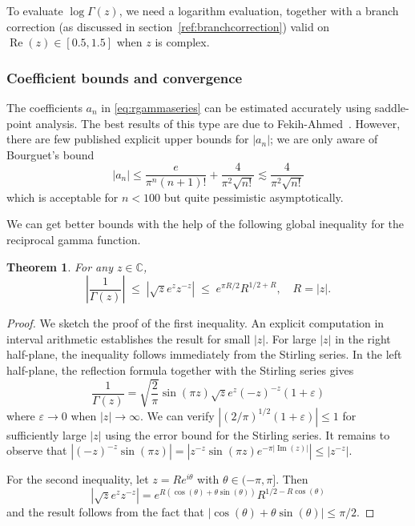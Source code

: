 \documentclass[reqno]{amsart}
\newcommand{\Real}{\operatorname{Re}}
\newcommand{\Imag}{\operatorname{Im}}
\newcommand{\CC}{\mathbb{C}}
\newtheorem{theorem}{Theorem}[section]
\theoremstyle{definition}
\begin{document}
To evaluate $\log \Gamma(z)$, we need a logarithm evaluation,
together with a branch correction (as discussed in section~\ref{ref:branchcorrection}) valid on $\Real(z) \in [0.5, 1.5]$
when $z$ is complex.


\subsubsection{Coefficient bounds and convergence}

The coefficients $a_n$ in \eqref{eq:rgammaseries} can be estimated accurately using
saddle-point analysis.
The best results of this type are due to Fekih-Ahmed~\cite{fekihahmed2017power}.
However, there are few published explicit upper bounds for $|a_n|$; we are only aware of Bourguet's bound \cite{Bourguet1883,fekihahmed2017power}
\begin{equation}
|a_n| \le \frac{e}{\pi^{n} (n+1)!} + \frac{4}{\pi^2 \sqrt{n!}} \lesssim \frac{4}{\pi^2 \sqrt{n!}}
\label{eq:bourguet}
\end{equation}
which is acceptable for $n < 100$ but quite pessimistic asymptotically.

We can get better
bounds with the help of the following global inequality for the reciprocal gamma function.

\begin{theorem}
\label{eq:globalbound}
For any $z \in \CC$,
\begin{equation}
\left| \frac{1}{\Gamma(z)} \right| \; \le \; \left| \sqrt{z} e^z z^{-z} \right| \; \le \; e^{\pi R/2} R^{1/2+R}, \quad R = |z|.
\end{equation}
\end{theorem}

\begin{proof}
We sketch the proof of the first inequality.
An explicit computation in interval arithmetic establishes the result for small $|z|$.
For large $|z|$ in the right half-plane, the inequality follows
immediately from the Stirling series.
In the left half-plane, the reflection formula together with the Stirling series
gives
\begin{equation}
\frac{1}{\Gamma(z)} = \sqrt{\frac{2}{\pi}} \sin(\pi z) \sqrt{z} e^{z} (-z)^{-z} (1 + \varepsilon)
\end{equation}
where $\varepsilon \to 0$ when $|z| \to \infty$. We can verify
$|(2 / \pi)^{1/2} (1 + \varepsilon)| \le 1$ for sufficiently large $|z|$
using the error bound for the Stirling series.
It remains to observe that $|(-z)^{-z} \sin(\pi z)| = |z^{-z} \sin(\pi z) e^{-\pi |\Imag(z)|}| \le |z^{-z}|$.

For the second inequality, let $z = R e^{i \theta}$ with $\theta \in (-\pi, \pi]$. Then
\begin{equation}
\left| \sqrt{z} e^z z^{-z} \right| = e^{R (\cos(\theta) + \theta \sin(\theta))} R^{1/2 - R \cos(\theta)}
\end{equation}
and the result follows from the fact that $|\cos(\theta) + \theta \sin(\theta)| \le \pi / 2$.
\end{proof}
\end{document}
